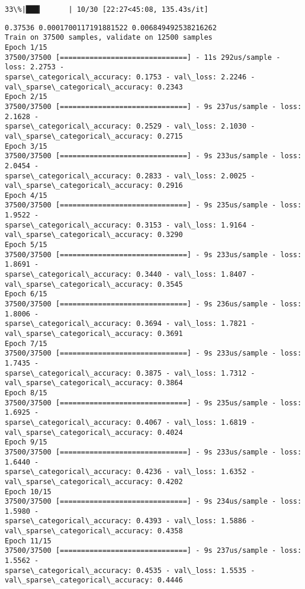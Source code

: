 \documentclass[11pt]{article}
\begin{document}
    \begin{Verbatim}[commandchars=\\\{\}]
 33\%|███▎      | 10/30 [22:27<45:08, 135.43s/it]
    \end{Verbatim}

    \begin{Verbatim}[commandchars=\\\{\}]
0.37536 0.0001700117191881522 0.006849492538216262
Train on 37500 samples, validate on 12500 samples
Epoch 1/15
37500/37500 [==============================] - 11s 292us/sample - loss: 2.2753 -
sparse\_categorical\_accuracy: 0.1753 - val\_loss: 2.2246 -
val\_sparse\_categorical\_accuracy: 0.2343
Epoch 2/15
37500/37500 [==============================] - 9s 237us/sample - loss: 2.1628 -
sparse\_categorical\_accuracy: 0.2529 - val\_loss: 2.1030 -
val\_sparse\_categorical\_accuracy: 0.2715
Epoch 3/15
37500/37500 [==============================] - 9s 233us/sample - loss: 2.0454 -
sparse\_categorical\_accuracy: 0.2833 - val\_loss: 2.0025 -
val\_sparse\_categorical\_accuracy: 0.2916
Epoch 4/15
37500/37500 [==============================] - 9s 235us/sample - loss: 1.9522 -
sparse\_categorical\_accuracy: 0.3153 - val\_loss: 1.9164 -
val\_sparse\_categorical\_accuracy: 0.3290
Epoch 5/15
37500/37500 [==============================] - 9s 233us/sample - loss: 1.8691 -
sparse\_categorical\_accuracy: 0.3440 - val\_loss: 1.8407 -
val\_sparse\_categorical\_accuracy: 0.3545
Epoch 6/15
37500/37500 [==============================] - 9s 236us/sample - loss: 1.8006 -
sparse\_categorical\_accuracy: 0.3694 - val\_loss: 1.7821 -
val\_sparse\_categorical\_accuracy: 0.3691
Epoch 7/15
37500/37500 [==============================] - 9s 233us/sample - loss: 1.7435 -
sparse\_categorical\_accuracy: 0.3875 - val\_loss: 1.7312 -
val\_sparse\_categorical\_accuracy: 0.3864
Epoch 8/15
37500/37500 [==============================] - 9s 235us/sample - loss: 1.6925 -
sparse\_categorical\_accuracy: 0.4067 - val\_loss: 1.6819 -
val\_sparse\_categorical\_accuracy: 0.4024
Epoch 9/15
37500/37500 [==============================] - 9s 233us/sample - loss: 1.6440 -
sparse\_categorical\_accuracy: 0.4236 - val\_loss: 1.6352 -
val\_sparse\_categorical\_accuracy: 0.4202
Epoch 10/15
37500/37500 [==============================] - 9s 234us/sample - loss: 1.5980 -
sparse\_categorical\_accuracy: 0.4393 - val\_loss: 1.5886 -
val\_sparse\_categorical\_accuracy: 0.4358
Epoch 11/15
37500/37500 [==============================] - 9s 237us/sample - loss: 1.5562 -
sparse\_categorical\_accuracy: 0.4535 - val\_loss: 1.5535 -
val\_sparse\_categorical\_accuracy: 0.4446

\end{Verbatim}
\end{document}
